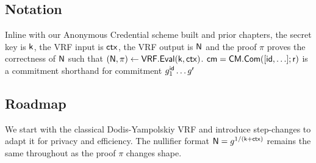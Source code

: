 \subsection*{Notation}
Inline with our Anonymous Credential scheme built and prior chapters, the secret key is $\mathsf{k}$, the VRF input is $\mathsf{ctx}$, the VRF output is $\mathsf{N}$ and the proof $\pi$ proves the correctness of $\mathsf{N}$ such that $(\mathsf{N}, \pi) \gets \mathsf{VRF.Eval}(\mathsf{k}, \mathsf{ctx})$. $\mathsf{cm} = \mathsf{CM.Com}([\mathsf{id},\ldots];\mathsf{r})$ is a commitment shorthand for commitment $g_1^{\mathsf{id}} \ldots g^{\mathsf{r}}$

\subsection*{Roadmap}
We start with the classical Dodis-Yampolskiy VRF \cite{hutchison_verifiable_2005} and introduce step-changes to adapt it for privacy and efficiency. The nullifier format $\mathsf{N} = g^{1/(\mathsf{k}+\mathsf{ctx})}$ remains the same throughout as the proof $\pi$ changes shape.
